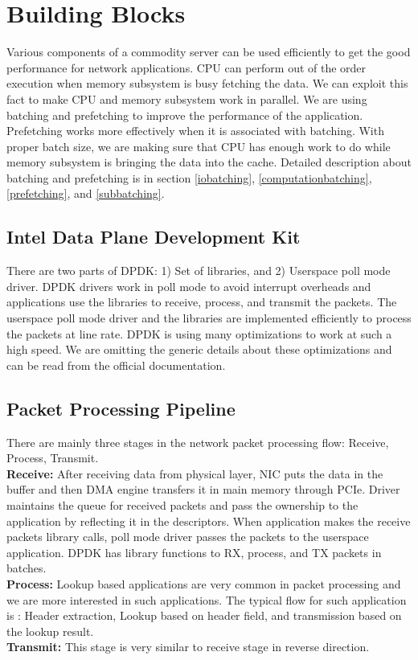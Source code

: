 \section{Building Blocks}
\label{section4}
Various components of a commodity server can be used efficiently to get the good performance for network applications. CPU can perform out of the order execution when memory subsystem is busy fetching the data. We can exploit this fact to make CPU and memory subsystem work in parallel. We are using batching and prefetching to improve the performance of the application. Prefetching works more effectively when it is associated with batching. With proper batch size, we are making sure that CPU has enough work to do while memory subsystem is bringing the data into the cache. Detailed description about batching and prefetching is in section \ref{iobatching}, \ref{computationbatching}, \ref{prefetching}, and \ref{subbatching}.

\subsection{Intel Data Plane Development Kit}
There are two parts of DPDK\cite{DPDK}: 1) Set of libraries, and 2) Userspace poll mode driver. DPDK drivers work in poll mode to avoid interrupt overheads and applications use the libraries to receive, process, and transmit the packets. The userspace poll mode driver and the libraries are implemented efficiently to process the packets at line rate. DPDK is using many optimizations to work at such a high speed. We are omitting the generic details about these optimizations and can be read from the official documentation. 

\subsection{Packet Processing Pipeline}
\label{overview}
There are mainly three stages in the network packet processing flow: Receive, Process, Transmit.
\\
\textbf{Receive:} After receiving data from physical layer, NIC puts the data in the buffer and then DMA engine transfers it in main memory through PCIe. Driver maintains the queue for received packets and pass the ownership to the application by reflecting it in the descriptors. When application makes the receive packets library calls, poll mode driver passes the packets to the userspace application. DPDK has library functions to RX, process, and TX packets in batches.
\\
\textbf{Process:} Lookup based applications are very common in packet processing and we are more interested in such applications. The typical flow for such application is : Header extraction, Lookup based on header field, and transmission based on the lookup result.
\\
\textbf{Transmit:} This stage is very similar to receive stage in reverse direction. 

